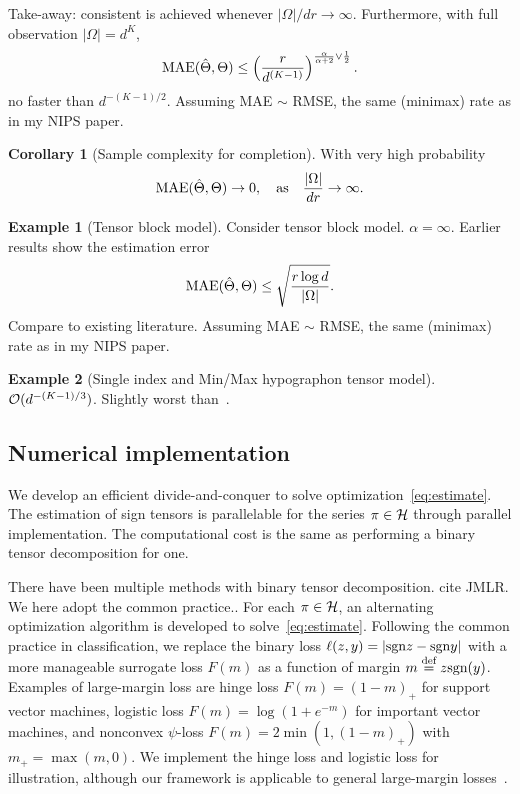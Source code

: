 \documentclass{article}
\theoremstyle{plain}
\theoremstyle{definition}
\newtheorem{cor}{Corollary}
\newtheorem{example}{Example}
\def\sign{\textup{sgn}}
\begin{document}
Take-away: consistent is achieved whenever $|\Omega|/dr\to\infty$. Furthermore, with full observation $|\Omega|=d^K$, 
\[
\textup{MAE}(\hat \Theta, \Theta)\leq \left(r\over d^{(K-1)}\right)^{{\alpha \over \alpha+2} \vee {1\over 2}}.
\]
no faster than $d^{-(K-1)/2}$. Assuming MAE $\sim$ RMSE, the same (minimax) rate as in my NIPS paper. 

\begin{cor}[Sample complexity for completion] With very high probability 
\[
\textup{MAE}(\hat \Theta, \Theta)\to 0, \quad \text{as}\quad {|\Omega|\over dr}\to \infty.
\]
\end{cor}


\begin{example}[Tensor block model]
Consider tensor block model. $\alpha=\infty$. Earlier results show the estimation error
\[
\textup{MAE}(\hat \Theta, \Theta)\leq \sqrt{r\log d \over |\Omega|}.
\]
Compare to existing literature. Assuming MAE $\sim$ RMSE, the same (minimax) rate as in my NIPS paper. 
 
\end{example}
\begin{example}[Single index and Min/Max hypographon tensor model]
$\mathcal{O}(d^{-(K-1)/3})$. Slightly worst than~\citet{ganti2015matrix}.
\end{example}

\subsection{Numerical implementation}
We develop an efficient divide-and-conquer to solve optimization~\eqref{eq:estimate}. The estimation of sign tensors is parallelable for the series $\pi \in \mathcal{H}$ through parallel implementation. The computational cost is the same as performing a binary tensor decomposition for one. 

There have been multiple methods with binary tensor decomposition. cite JMLR. We here adopt the common practice.. For each $\pi\in\mathcal{H}$, an alternating optimization algorithm is developed to solve~\eqref{eq:estimate}. Following the common practice in classification, we replace the binary loss $\ell(z,y)=|\sign z - \sign y|$ with a more manageable surrogate loss $F(m)$ as a function of margin $m\stackrel{\text{def}}{=}z\sign(y)$. Examples of large-margin loss are hinge loss $F(m) = (1-m)_+$ for support vector machines, logistic loss $F(m) =\log(1+e^{-m})$ for important vector machines, and nonconvex $\psi$-loss $F(m)=2\min(1,(1-m)_+)$ with $m_{+}=\max(m,0)$. We implement the hinge loss and logistic loss for illustration, although our framework is applicable to general large-margin losses~\citep{bartlett2006convexity}. 
\end{document}

